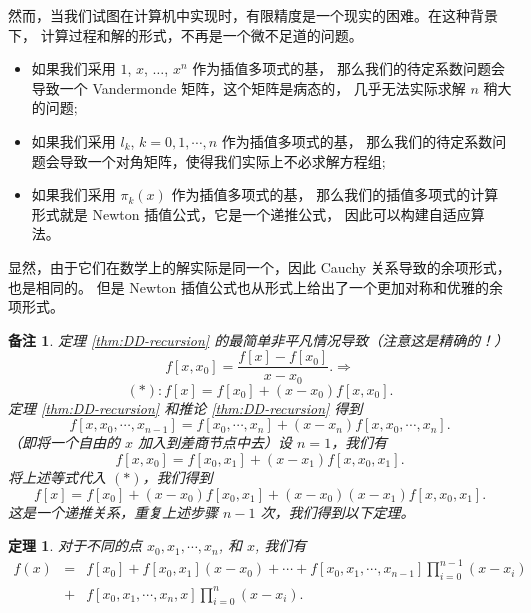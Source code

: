 \documentclass[a4paper]{ctexart}
\newtheorem{theorem}{定理}
\newtheorem{remark}{备注}
\numberwithin{theorem}{section}
\numberwithin{equation}{section}
\numberwithin{figure}{section}
\numberwithin{remark}{section}
\begin{document}
然而，当我们试图在计算机中实现时，有限精度是一个现实的困难。在这种背景下，
计算过程和解的形式，不再是一个微不足道的问题。

\begin{itemize}
  \item 如果我们采用 $1$, $x$, $\ldots$, $x^n$ 作为插值多项式的基，
  那么我们的待定系数问题会导致一个 Vandermonde 矩阵，这个矩阵是病态的，
  几乎无法实际求解 $n$ 稍大的问题;
  \item 如果我们采用 $l_k$, $k = 0, 1, \cdots, n$ 作为插值多项式的基，
  那么我们的待定系数问题会导致一个对角矩阵，使得我们实际上不必求解方程组;
  \item 如果我们采用 $\pi_k(x)$ 作为插值多项式的基，
  那么我们的插值多项式的计算形式就是 Newton 插值公式，它是一个递推公式，
  因此可以构建自适应算法。
\end{itemize}

显然，由于它们在数学上的解实际是同一个，因此 Cauchy 关系导致的余项形式，也是相同的。
但是 Newton 插值公式也从形式上给出了一个更加对称和优雅的余项形式。

\begin{remark}
定理 \ref{thm:DD-recursion} 的最简单非平凡情况导致（注意这是精确的！）
\[
f[x, x_0] = \frac{f[x] - f[x_0]}{x - x_0}. \Rightarrow
\]
\[
(\ast) : f [x] = f [x_0 ] + (x - x_0 )f [x, x_0 ].
\]
定理 \ref{thm:DD-recursion} 和推论 \ref{thm:DD-recursion} 得到
\[
f [x, x_0 , \cdots , x_{n-1}] = f [x_0 , \cdots , x_n ] + (x - x_n )f [x, x_0 , \cdots , x_n].
\]
（即将一个自由的 $x$ 加入到差商节点中去）设 $n = 1$，我们有
\[
f [x, x_0 ] = f [x_0 , x_1] + (x - x_1 )f [x, x_0 , x_1].
\]
将上述等式代入 $(\ast)$，我们得到
\[
f [x] = f [x_0 ] + (x - x_0 )f [x_0 , x_1 ] + (x - x_0)(x - x_1)f [x, x_0, x_1].
\]
这是一个递推关系，重复上述步骤 $n - 1$ 次，我们得到以下定理。
    
\end{remark}

\begin{theorem}
    \label{thm::newton_remainder}
对于不同的点 $x_0 , x_1 , \cdots , x_n$, 和 $x$, 我们有
\begin{equation}
    \label{eq::newton_remainder}
    \begin{array}{rcl}
  f (x) &=& f [x_0 ] + f [x_0 , x_1 ](x - x_0 ) + \cdots + f [x_0, x_1, \cdots , x_{n-1} ] \prod_{i=0}^{n-1} (x - x_i ) \\
  &+& f [x_0, x_1, \cdots , x_n , x] \prod_{i=0}^{n} (x - x_i ). 
    \end{array}
\end{equation}
    
\end{theorem}
\end{document}
